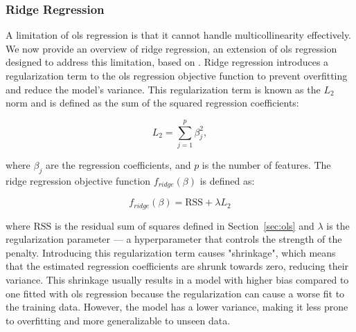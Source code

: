 \subsubsection{Ridge Regression}
A limitation of \gls{ols} regression is that it cannot handle multicollinearity effectively.
We now provide an overview of ridge regression, an extension of \gls{ols} regression designed to address this limitation, based on \citet{James2023AnIS}.
Ridge regression introduces a regularization term to the \gls{ols} regression objective function to prevent overfitting and reduce the model's variance.
This regularization term is known as the $L_2$ norm and is defined as the sum of the squared regression coefficients:

$$
L_2 = \sum_{j=1}^{p} \beta_j^2,
$$

where $\beta_j$ are the regression coefficients, and $p$ is the number of features.
The ridge regression objective function $f_{ridge}(\beta)$ is defined as:

$$
f_{ridge}(\beta) = \text{RSS} + \lambda L_2
$$

where $\text{RSS}$ is the residual sum of squares defined in Section~\ref{sec:ols} and $\lambda$ is the regularization parameter --- a hyperparameter that controls the strength of the penalty.
Introducing this regularization term causes "shrinkage", which means that the estimated regression coefficients are shrunk towards zero, reducing their variance.
This shrinkage usually results in a model with higher bias compared to one fitted with \gls{ols} regression because the regularization can cause a worse fit to the training data.
However, the model has a lower variance, making it less prone to overfitting and more generalizable to unseen data.